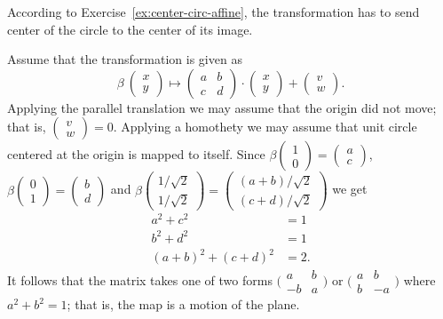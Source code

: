 According to Exercise~\ref{ex:center-circ-affine}, the transformation has to send center of the circle to the center of its image.

Assume that the transformation is given as
\[\beta\:\left(\begin{smallmatrix}
x\\ y
\end{smallmatrix} \right)
  \mapsto
  \left(\begin{smallmatrix}
a&b\\ c&d
\end{smallmatrix} \right)
  \cdot
  \left(\begin{smallmatrix}
x\\ y
\end{smallmatrix} \right)
  +
\left(\begin{smallmatrix}
v\\ w
\end{smallmatrix} \right).
\]
Applying the parallel translation we may assume that the origin did not move; 
that is, $\left(\begin{smallmatrix}
v\\ w
\end{smallmatrix} \right)=0$.
Applying a homothety we may assume that unit circle centered at the origin is mapped to itself.
Since $\beta\left(\begin{smallmatrix}
1\\ 0
\end{smallmatrix} \right)
=
\left(\begin{smallmatrix}
a\\c 
\end{smallmatrix} \right)$,
$\beta\left(\begin{smallmatrix}
0\\ 1
\end{smallmatrix} \right)
=
\left(\begin{smallmatrix}
b\\d 
\end{smallmatrix} \right)$ 
and 
$\beta\left(\begin{smallmatrix}
1/\sqrt{2}\\ 1/\sqrt{2}
\end{smallmatrix} \right)
=
\left(\begin{smallmatrix}
(a+b)/\sqrt{2}\\(c+d)/\sqrt{2} 
\end{smallmatrix} \right)$
we get
\begin{align*}
a^2+c^2&=1\\
b^2+d^2&=1\\
(a+b)^2+(c+d)^2&=2.
\end{align*}
It follows that the matrix takes one of two forms $\bigl(\begin{smallmatrix}
a&b\\ -b&a
\end{smallmatrix} \bigr)$
or 
$\bigl(\begin{smallmatrix}
a&b\\ b&-a
\end{smallmatrix} \bigr)$ where $a^2+b^2=1$;
that is, the map is a motion of the plane.




